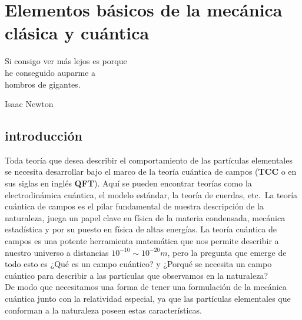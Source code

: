 %
%

\chapter{Elementos básicos de la mecánica clásica y cuántica}

\begin{FraseCelebre}
\begin{Frase}
    Si consigo ver más lejos es porque\\
    he conseguido auparme a\\
    hombros de gigantes.
\end{Frase}
\begin{Fuente}
    Isaac Newton
\end{Fuente}
\end{FraseCelebre}



\section{introducción}
\label{cap1:sec:Introduccion}

Toda teoría que desea describir el comportamiento de las partículas elementales se necesita desarrollar bajo  el marco de la teoría cuántica de campos (\textbf{TCC} o en sus siglas en inglés \textbf{QFT}). Aquí se pueden encontrar teorías como la electrodinámica cuántica, el modelo estándar, la teoría de cuerdas, etc.\
La teoría cuántica de campos es el pilar fundamental de nuestra descripción de la naturaleza, juega un papel clave en física de la materia condensada,  mecánica estadística y por su puesto en física de altas energías. La teoría cuántica de campos es una potente herramienta matemática que nos permite describir a nuestro universo a distancias $ 10^{-10} \sim 10^{-20} m$, pero la pregunta que emerge de todo esto es ¿Qué es un campo cuántico? y ¿Porqué se necesita un campo cuántico para describir a las partículas que observamos en la naturaleza?\\
De modo que necesitamos una forma de tener una formulación de la mecánica cuántica junto con la relatividad especial, ya que las partículas elementales que conforman a la naturaleza poseen estas características.

